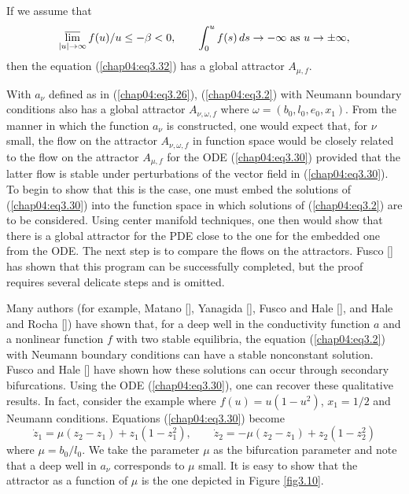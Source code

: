 \documentclass{surv-l}
\theoremstyle{plain}
\theoremstyle{definition}
\numberwithin{equation}{section}
\numberwithin{figure}{chapter}
\begin{document}
If we assume that
\begin{equation}\label{chap04:eq3.32}
\varlimsup_{|u|\rightarrow\infty}f(u)/u\leq-\beta<0,\qquad \int_{0}^{u}f(s)\,ds\rightarrow-\infty\ \mathrm{as}\ u \rightarrow\pm\infty,
\end{equation}
then the equation (\ref{chap04:eq3.32}) has a global attractor $A_{\mu,f}$.

With $a_{\nu}$ defined as in (\ref{chap04:eq3.26}), (\ref{chap04:eq3.2}) with Neumann boundary conditions also has a global attractor $A_{\nu,\omega,f}$ where $\omega=(b_{0}, l_{0}, e_{0}, x_{1})$. From the manner in which the function $a_{\nu}$ is constructed, one would expect that, for $\nu$ small, the flow on the attractor $A_{\nu,\omega,f}$ in function space would be closely related to the flow on the attractor $A_{\mu,f}$ for the ODE (\ref{chap04:eq3.30}) provided that the latter flow is stable under perturbations of the vector field in (\ref{chap04:eq3.30}). To begin to show that this is the case, one must embed the solutions of (\ref{chap04:eq3.30}) into the function space in which solutions of (\ref{chap04:eq3.2}) are to be considered. Using center manifold techniques, one then would show that there is a global attractor for the PDE close to the one for the embedded one from the ODE. The next step is to compare the flows on the attractors. Fusco [\citeyear{1987f}] has shown that this program can be successfully completed, but the proof requires several delicate steps and is omitted.

Many authors (for example, Matano [\citeyear{1979m}], Yanagida [\citeyear{1982y}], Fusco and Hale [\citeyear{1985fh}], and Hale and Rocha [\citeyear{1985hr}]) have shown that, for a deep well in the conductivity function $a$ and a nonlinear function $f$ with two stable equilibria, the equation (\ref{chap04:eq3.2}) with Neumann boundary conditions can have a stable nonconstant solution. Fusco and Hale [\citeyear{1985fh}] have shown how these solutions can occur through secondary bifurcations. Using the ODE (\ref{chap04:eq3.30}), one can recover these qualitative results. In fact, consider the example where $f(u)=u(1-u^{2})$, $x_{1}=1/2$ and Neumann conditions. Equations (\ref{chap04:eq3.30}) become
\begin{equation}\label{chap04:eq3.33}
\dot{z}_{1}=\mu(z_{2}-z_{1})+z_{1}(1-z_{1}^{2}), \qquad \dot{z}_{2}=-\mu(z_{2}-z_{1})+z_{2}(1-z_{2}^{2})
\end{equation}
where $\mu=b_{0}/l_{0}$. We take the parameter $\mu$ as the bifurcation parameter and note that a deep well in $a_{\nu}$ corresponds to $\mu$ small. It is easy to show that the attractor as a function of $\mu$ is the one depicted in Figure \ref{fig3.10}.
\end{document}
